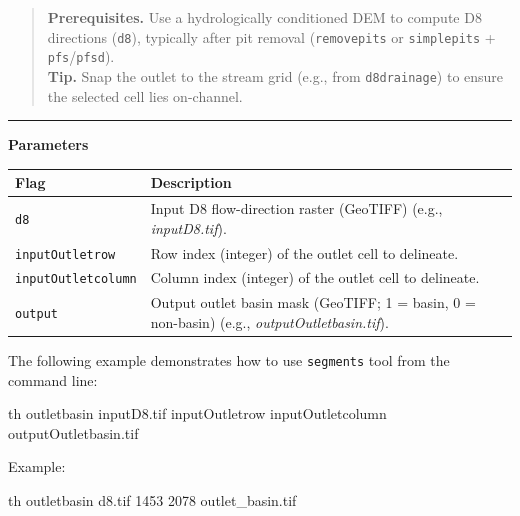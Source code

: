 \documentclass[
]{book}
\newenvironment{Shaded}{\begin{snugshade}}{\end{snugshade}}
\newcommand{\ExtensionTok}[1]{#1}
\newcommand{\NormalTok}[1]{#1}
\begin{document}
\begin{quote}
\textbf{Prerequisites.} Use a hydrologically conditioned DEM to compute D8 directions (\texttt{d8}), typically after pit removal (\texttt{removepits} or \texttt{simplepits} + \texttt{pfs}/\texttt{pfsd}).\\
\textbf{Tip.} Snap the outlet to the stream grid (e.g., from \texttt{d8drainage}) to ensure the selected cell lies on-channel.
\end{quote}

\begin{center}\rule{0.5\linewidth}{0.5pt}\end{center}

\textbf{Parameters}

\begin{longtable}[]{@{}
  >{\raggedright\arraybackslash}p{}
  >{\raggedright\arraybackslash}p{}@{}}
\toprule\noalign{}
\begin{minipage}[b]{\linewidth}\raggedright
Flag
\end{minipage} & \begin{minipage}[b]{\linewidth}\raggedright
Description
\end{minipage} \\
\midrule\noalign{}
\endhead
\bottomrule\noalign{}
\endlastfoot
\texttt{d8} & Input D8 flow-direction raster (GeoTIFF) (e.g., \emph{inputD8.tif}). \\
\texttt{inputOutletrow} & Row index (integer) of the outlet cell to delineate. \\
\texttt{inputOutletcolumn} & Column index (integer) of the outlet cell to delineate. \\
\texttt{output} & Output outlet basin mask (GeoTIFF; 1 = basin, 0 = non-basin) (e.g., \emph{outputOutletbasin.tif}). \\
\end{longtable}

The following example demonstrates how to use \texttt{segments} tool from the command line:

\begin{Shaded}
\begin{Highlighting}[]
\ExtensionTok{th}\NormalTok{ outletbasin inputD8.tif inputOutletrow inputOutletcolumn outputOutletbasin.tif}
\end{Highlighting}
\end{Shaded}

Example:

\begin{Shaded}
\begin{Highlighting}[]
\ExtensionTok{th}\NormalTok{ outletbasin d8.tif 1453 2078 outlet\_basin.tif}
\end{Highlighting}
\end{Shaded}
\end{document}
